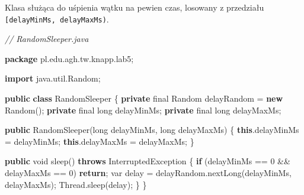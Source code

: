 \documentclass[11pt]{article}
\newenvironment{Shaded}{}{}
\newcommand{\KeywordTok}[1]{\textcolor[rgb]{0.00,0.44,0.13}{\textbf{{#1}}}}
\newcommand{\DataTypeTok}[1]{\textcolor[rgb]{0.56,0.13,0.00}{{#1}}}
\newcommand{\DecValTok}[1]{\textcolor[rgb]{0.25,0.63,0.44}{{#1}}}
\newcommand{\CommentTok}[1]{\textcolor[rgb]{0.38,0.63,0.69}{\textit{{#1}}}}
\newcommand{\FunctionTok}[1]{\textcolor[rgb]{0.02,0.16,0.49}{{#1}}}
\newcommand{\NormalTok}[1]{{#1}}
\newcommand{\ImportTok}[1]{{#1}}
\newcommand{\ControlFlowTok}[1]{\textcolor[rgb]{0.00,0.44,0.13}{\textbf{{#1}}}}
\newcommand{\OperatorTok}[1]{\textcolor[rgb]{0.40,0.40,0.40}{{#1}}}
\newcommand{\BuiltInTok}[1]{{#1}}
\begin{document}
Klasa służąca do uśpienia wątku na pewien czas, losowany z przedziału
\texttt{{[}delayMinMs,\ delayMaxMs)}.

\begin{Shaded}
\begin{Highlighting}[]
\CommentTok{// RandomSleeper.java}

\KeywordTok{package}\ImportTok{ pl}\OperatorTok{.}\ImportTok{edu}\OperatorTok{.}\ImportTok{agh}\OperatorTok{.}\ImportTok{tw}\OperatorTok{.}\ImportTok{knapp}\OperatorTok{.}\ImportTok{lab5}\OperatorTok{;}

\KeywordTok{import} \ImportTok{java}\OperatorTok{.}\ImportTok{util}\OperatorTok{.}\ImportTok{Random}\OperatorTok{;}

\KeywordTok{public} \KeywordTok{class}\NormalTok{ RandomSleeper }\OperatorTok{\{}
    \KeywordTok{private} \DataTypeTok{final} \BuiltInTok{Random}\NormalTok{ delayRandom }\OperatorTok{=} \KeywordTok{new} \BuiltInTok{Random}\OperatorTok{();}
    \KeywordTok{private} \DataTypeTok{final} \DataTypeTok{long}\NormalTok{ delayMinMs}\OperatorTok{;}
    \KeywordTok{private} \DataTypeTok{final} \DataTypeTok{long}\NormalTok{ delayMaxMs}\OperatorTok{;}

    \KeywordTok{public} \FunctionTok{RandomSleeper}\OperatorTok{(}\DataTypeTok{long}\NormalTok{ delayMinMs}\OperatorTok{,} \DataTypeTok{long}\NormalTok{ delayMaxMs}\OperatorTok{)} \OperatorTok{\{}
        \KeywordTok{this}\OperatorTok{.}\FunctionTok{delayMinMs} \OperatorTok{=}\NormalTok{ delayMinMs}\OperatorTok{;}
        \KeywordTok{this}\OperatorTok{.}\FunctionTok{delayMaxMs} \OperatorTok{=}\NormalTok{ delayMaxMs}\OperatorTok{;}
    \OperatorTok{\}}

    \KeywordTok{public} \DataTypeTok{void} \FunctionTok{sleep}\OperatorTok{()} \KeywordTok{throws} \BuiltInTok{InterruptedException} \OperatorTok{\{}
        \ControlFlowTok{if} \OperatorTok{(}\NormalTok{delayMinMs }\OperatorTok{==} \DecValTok{0} \OperatorTok{\&\&}\NormalTok{ delayMaxMs }\OperatorTok{==} \DecValTok{0}\OperatorTok{)}
            \ControlFlowTok{return}\OperatorTok{;}
        \DataTypeTok{var}\NormalTok{ delay }\OperatorTok{=}\NormalTok{ delayRandom}\OperatorTok{.}\FunctionTok{nextLong}\OperatorTok{(}\NormalTok{delayMinMs}\OperatorTok{,}\NormalTok{ delayMaxMs}\OperatorTok{);}
        \BuiltInTok{Thread}\OperatorTok{.}\FunctionTok{sleep}\OperatorTok{(}\NormalTok{delay}\OperatorTok{);}
    \OperatorTok{\}}
\OperatorTok{\}}
\end{Highlighting}
\end{Shaded}
\end{document}
